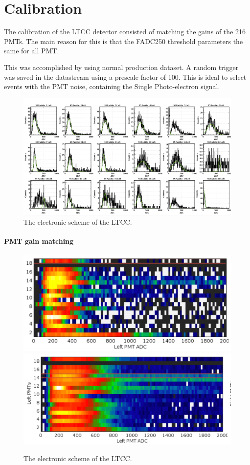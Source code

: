 \section{Calibration}

The calibration of the LTCC detector consisted of matching the gains of the 216 PMTs.
The main reason for this is that the FADC250 threshold parameters the same for all PMT.

This was accomplished by using normal production dataset.
A random trigger was saved in the datastream using a prescale factor of 100. This is ideal to select
events with the PMT noise, containing the Single Photo-electron signal.  





\begin{figure}
	\centering
	\includegraphics[width=0.95\columnwidth,keepaspectratio]{img/spe.png}
	\caption{The electronic scheme of the LTCC.}
	\label{fig:speCalibration}
\end{figure}


\paragraph{PMT gain matching}


\begin{figure}
	\centering
	\includegraphics[width=0.95\columnwidth,keepaspectratio]{img/gainMatchingBefore.png}
	\includegraphics[width=0.95\columnwidth,keepaspectratio]{img/gainMatchingAfter.png}
	\caption{The electronic scheme of the LTCC.}
	\label{fig:gainMatching}
\end{figure}




